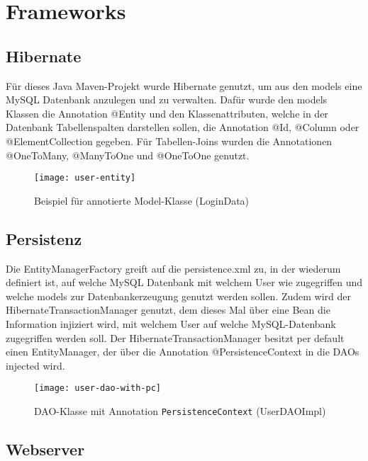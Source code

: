\section{Frameworks}\label{sec:frameworks}

\subsection{Hibernate}\label{subsec:hibernate}

Für dieses Java Maven-Projekt wurde Hibernate genutzt, um aus den models
eine MySQL Datenbank anzulegen und zu verwalten.
Dafür wurde den models Klassen die Annotation @Entity und den Klassenattributen, welche
in der Datenbank Tabellenspalten darstellen sollen, die Annotation @Id, @Column oder @ElementCollection gegeben.
Für Tabellen-Joins wurden die Annotationen @OneToMany, @ManyToOne und @OneToOne genutzt.

\begin{figure}[H]
    \centering
    \texttt{[image: user-entity]}
    \caption[]{Beispiel für annotierte Model-Klasse (LoginData)}
    \label{fig:user-entity}
\end{figure}

\subsection{Persistenz}\label{subsec:persistenz}

Die EntityManagerFactory greift auf die persistence.xml zu, in der wiederum definiert ist, auf welche MySQL Datenbank mit welchem User wie zugegriffen
und welche models zur Datenbankerzeugung genutzt werden sollen.
Zudem wird der HibernateTransactionManager genutzt, dem dieses Mal über eine Bean die Information injiziert wird,
mit welchem User auf welche MySQL-Datenbank zugegriffen werden soll.
Der HibernateTransactionManager besitzt per default einen EntityManager, der
über die Annotation @PersistenceContext in die DAOs injected wird.

\begin{figure}[H]
    \centering
    \texttt{[image: user-dao-with-pc]}
    \caption[]{DAO-Klasse mit Annotation \texttt{PersistenceContext} (UserDAOImpl)}
    \label{fig:userdao}
\end{figure}

\subsection{Webserver}\label{subsec:webserver}

